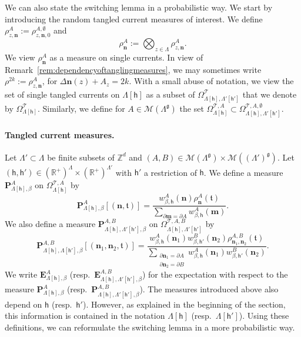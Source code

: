 \documentclass[11pt,a4paper]{article}
\theoremstyle{definition}
\numberwithin{equation}{section}
\newcommand\n{\mathbf{n}}
\newcommand\fg{\mathfrak{g}}
\newcommand\ft{\mathfrak{t}}
\newcommand\m{\mathbf{m}}
\begin{document}
We can also state the switching lemma in a probabilistic way. We start by introducing the random tangled current measures of interest. We define $\rho^{A}_{z,\n}:=\rho_{z,\n,0}^{A,\emptyset}$ and
\begin{equation}
    \rho_{\n}^A:=\bigotimes_{z\in \Lambda}\rho^{A}_{z,\n}.
\end{equation}
We view $\rho^A_{\n}$ as a measure on single currents. 
In view of Remark~\ref{rem:dependencyoftanglingmeasures}, we may sometimes write $\rho^{2k}:=\rho^{A}_{z,\n}$, for $\Delta{\n}(z)+A_z=2k$.
With a small abuse of notation, we view the set of single tangled currents on $\Lambda[\mathsf{h}]$ as a subset of $\Omega^\mathcal{T}_{\Lambda[\mathsf{h}],\Lambda'[\mathsf{h}']}$ that we denote by $\Omega_{\Lambda[\mathsf{h}]}^{\mathcal{T}}$. Similarly, we define for $A\in \mathcal M(\Lambda^\fg)$ the set $\Omega_{\Lambda[\mathsf{h}]}^{\mathcal{T},A}\subset \Omega_{\Lambda[\mathsf{h}],\Lambda'[\mathsf{h}']}^{\mathcal{T},A,\emptyset}$.

\paragraph{Tangled current measures.}

Let $\Lambda'\subset\Lambda$ be finite subsets of $\mathbb Z^d$ and $(A,B) \in \mathcal{M}(\Lambda^\fg)\times \mathcal{M}((\Lambda')^\fg)$. Let $(\mathsf{h},\mathsf{h}')\in (\mathbb R^+)^\Lambda\times (\mathbb R^+)^{\Lambda'}$ with $\mathsf{h}'$ a restriction of $\mathsf{h}$. We define a measure $\mathbf P^{A}_{\Lambda[\mathsf{h}],\beta}$ on $\Omega_{\Lambda[\mathsf{h}]}^{\mathcal{T},A}$ by
\begin{equation}
    \mathbf P^{A}_{\Lambda[\mathsf{h}],\beta}[(\n,\mathfrak{t})]=\frac{w_{\beta,\mathsf{h}}^A(\n)\rho^A_{\n}(\mathfrak{t})}{\sum_{\partial \m=\partial A}w_{\beta,\mathsf{h}}^A(\m)}.
\end{equation}
We also define a measure $\mathbf P_{\Lambda[\mathsf{h}],\Lambda'[\mathsf{h}'],\beta}^{A,B}$ on $\Omega^{\mathcal{T},A,B}_{\Lambda[\mathsf{h}],\Lambda'[\mathsf{h}']}$ by
\begin{equation}
    \mathbf P^{A,B}_{\Lambda[\mathsf{h}],\Lambda[\mathsf{h}'],\beta}[(\n_1,\n_2,\ft)]=\frac{w_{\beta,\mathsf{h}}^A(\n_1)w_{\beta,\mathsf{h}'}^B(\n_2)\rho_{\n_1,\n_2}^{A,B}(\mathfrak{t})}{\sum_{\substack{\partial \n_1=\partial A\\ \partial \n_2=\partial B}}w_{\beta,\mathsf{h}}^A(\n_1)w_{\beta,\mathsf{h}'}^B(\n_2)}.
\end{equation}
We write $\mathbf{E}^A_{\Lambda[\mathsf{h}],\beta}$ (resp.\ $\mathbf{E}^{A,B}_{\Lambda[\mathsf{h}],\Lambda'[\mathsf{h}'],\beta}$) for the expectation with respect to the measure $\mathbf{P}^A_{\Lambda[\mathsf{h}],\beta}$ (resp.\ $\mathbf{P}^{A,B}_{\Lambda[\mathsf{h}],\Lambda'[\mathsf{h}'],\beta}$). The measures introduced above also depend on $\mathsf{h}$ (resp.\ $\mathsf{h}'$). However, as explained in the beginning of the section, this information is contained in the notation $\Lambda[\mathsf{h}]$ (resp.\ $\Lambda[\mathsf{h}']$). 
Using these definitions, we can reformulate the switching lemma in a more probabilistic way.
\end{document}
